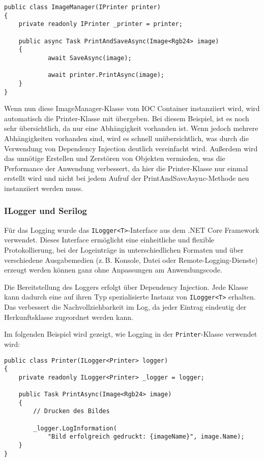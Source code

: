 \begin{lstlisting}
public class ImageManager(IPrinter printer)
{
    private readonly IPrinter _printer = printer;

    public async Task PrintAndSaveAsync(Image<Rgb24> image)
    {
            await SaveAsync(image);

            await printer.PrintAsync(image);
    }
}
\end{lstlisting}

Wenn nun diese ImageManager-Klasse vom IOC Container instanziiert wird,
wird automatisch die Printer-Klasse mit übergeben. Bei diesem Beispiel, 
ist es noch sehr übersichtlich, da nur eine Abhängigkeit vorhanden ist.
Wenn jedoch mehrere Abhängigkeiten vorhanden sind, wird es schnell
unübersichtlich, was durch die Verwendung von Dependency Injection
deutlich vereinfacht wird. Außerdem wird das unnötige Erstellen und
Zerstören von Objekten vermieden, was die Performance der Anwendung
verbessert, da hier die Printer-Klasse nur einmal erstellt wird und
nicht bei jedem Aufruf der PrintAndSaveAsync-Methode neu instanziiert werden muss.

\subsubsection{ILogger und Serilog}

Für das Logging wurde das \texttt{ILogger\textless{}T\textgreater{}}-Interface
aus dem .NET Core Framework verwendet. Dieses Interface ermöglicht eine
einheitliche und flexible Protokollierung, bei der Logeinträge in
unterschiedlichen Formaten und über verschiedene Ausgabemedien
(z.\,B. Konsole, Datei oder Remote-Logging-Dienste) erzeugt werden können 
ganz ohne Anpassungen am Anwendungscode.

Die Bereitstellung des Loggers erfolgt über Dependency Injection.
Jede Klasse kann dadurch eine auf ihren Typ spezialisierte Instanz von
\texttt{ILogger\textless{}T\textgreater{}} erhalten. Das verbessert die
Nachvollziehbarkeit im Log, da jeder Eintrag eindeutig der Herkunftsklasse
zugeordnet werden kann.

Im folgenden Beispiel wird gezeigt, wie Logging in der \texttt{Printer}-Klasse
verwendet wird:

\begin{lstlisting}
public class Printer(ILogger<Printer> logger)
{
    private readonly ILogger<Printer> _logger = logger;

    public Task PrintAsync(Image<Rgb24> image)
    {
        // Drucken des Bildes

        _logger.LogInformation(
            "Bild erfolgreich gedruckt: {imageName}", image.Name);
    }
}
\end{lstlisting}

